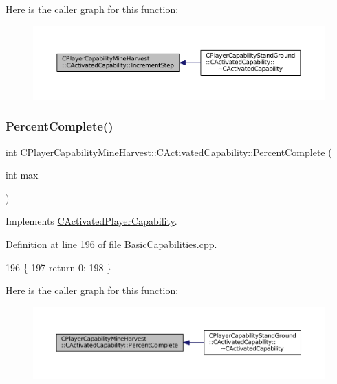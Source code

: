 Here is the caller graph for this function\+:
\nopagebreak
\begin{figure}[H]
\begin{center}
\leavevmode
\includegraphics[width=350pt]{classCPlayerCapabilityMineHarvest_1_1CActivatedCapability_a46dbd6e2ae2fb889da1714c97ed3ca2f_icgraph}
\end{center}
\end{figure}
\hypertarget{classCPlayerCapabilityMineHarvest_1_1CActivatedCapability_ac198166a008306dc543ceed94baaf4a3}{}\label{classCPlayerCapabilityMineHarvest_1_1CActivatedCapability_ac198166a008306dc543ceed94baaf4a3} 
\subsubsection{\texorpdfstring{Percent\+Complete()}{PercentComplete()}}
{\footnotesize\ttfamily int C\+Player\+Capability\+Mine\+Harvest\+::\+C\+Activated\+Capability\+::\+Percent\+Complete (\begin{DoxyParamCaption}\item[{int}]{max }\end{DoxyParamCaption})\hspace{0.3cm}{\ttfamily [virtual]}}



Implements \hyperlink{classCActivatedPlayerCapability_a405dc6076058006a4f801727de4cfe4d}{C\+Activated\+Player\+Capability}.



Definition at line 196 of file Basic\+Capabilities.\+cpp.


\begin{DoxyCode}
196                                                                             \{
197     \textcolor{keywordflow}{return} 0;
198 \}
\end{DoxyCode}
Here is the caller graph for this function\+:
\nopagebreak
\begin{figure}[H]
\begin{center}
\leavevmode
\includegraphics[width=350pt]{classCPlayerCapabilityMineHarvest_1_1CActivatedCapability_ac198166a008306dc543ceed94baaf4a3_icgraph}
\end{center}
\end{figure}


